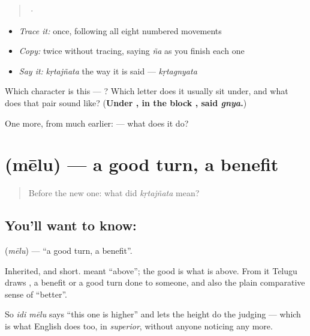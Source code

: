 \begin{quote}
  ·  
\end{quote}

\begin{itemize}
\raggedright
  \item \emph{Trace it:}  once, following all eight numbered movements
  \item \emph{Copy:}  twice without tracing, saying \emph{ña} as you finish each one
  \item \emph{Say it:} \emph{kṛtajñata} the way it is said — \emph{kṛtagnyata}
\end{itemize}

\begin{tcolorbox}[breakable,colback=teal!4,colframe=teal!35!black,title={Before you move on}]
Which character is this — ? Which letter does it usually sit under, and what does that pair sound like? (\textbf{Under , in the block , said \emph{gnya}.})

One more, from much earlier:  — what does it do?
\end{tcolorbox}
\section[\texorpdfstring{\te{మేలు} (mēlu)}{మేలు (mēlu)}]{ (mēlu) — a good turn, a benefit}

\label{lesson:TE-C51-favour}



\begin{quote}
Before the new one: what did \emph{kṛtajñata} mean?
\end{quote}

\subsection*{You'll want to know: }
\textbf{} (\emph{mēlu}) — \textquotedblleft{}a good turn, a benefit\textquotedblright{}.

Inherited, and short.  meant \textquotedblleft{}above\textquotedblright{}; the good is what is above. From it Telugu draws , a benefit or a good turn done to someone, and also the plain comparative sense of \textquotedblleft{}better\textquotedblright{}.

So \emph{idi mēlu} says \textquotedblleft{}this one is higher\textquotedblright{} and lets the height do the judging --- which is what English does too, in \emph{superior}, without anyone noticing any more.

